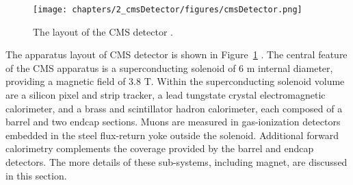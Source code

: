 \begin{figure}
    \centering
    \texttt{[image: chapters/2\_cmsDetector/figures/cmsDetector.png]}
    \caption{The layout of the CMS detector \cite{cms:detectorOverview}.}
    \label{fig:exp:detectorOverview}
\end{figure}

The apparatus layout of CMS detector is shown in Figure~\ref{fig:exp:detectorOverview} \cite{cms:detectorOverview}. The central feature of the CMS apparatus is a superconducting solenoid of 6 m internal diameter, providing a magnetic field of 3.8 T. Within the superconducting solenoid volume are a silicon pixel and strip tracker, a lead tungstate crystal electromagnetic calorimeter, and a brass and scintillator hadron calorimeter, each composed of a barrel and two endcap sections. Muons are measured in gas-ionization detectors embedded in the steel flux-return yoke outside the solenoid. Additional forward calorimetry complements the coverage provided by the barrel and endcap detectors. The more details of these sub-systems, including magnet,  are discussed in this section. 





